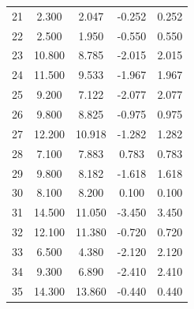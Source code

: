 \begin{table}[H]
\begin{tabular}{|c|c|c|c|c|}
		21 & 2.300 & 2.047 & -0.252 & 0.252 \\
		22 & 2.500 & 1.950 & -0.550 & 0.550 \\
		23 & 10.800 & 8.785 & -2.015 & 2.015 \\
		24 & 11.500 & 9.533 & -1.967 & 1.967 \\
		25 & 9.200 & 7.122 & -2.077 & 2.077 \\
		26 & 9.800 & 8.825 & -0.975 & 0.975 \\
		27 & 12.200 & 10.918 & -1.282 & 1.282 \\
		28 & 7.100 & 7.883 & 0.783 & 0.783 \\
		29 & 9.800 & 8.182 & -1.618 & 1.618 \\
		30 & 8.100 & 8.200 & 0.100 & 0.100 \\
		31 & 14.500 & 11.050 & -3.450 & 3.450 \\
		32 & 12.100 & 11.380 & -0.720 & 0.720 \\
		33 & 6.500 & 4.380 & -2.120 & 2.120 \\
		34 & 9.300 & 6.890 & -2.410 & 2.410 \\
		35 & 14.300 & 13.860 & -0.440 & 0.440 \\
		\hline
	\end{tabular}
	\label{tab:depth_results}
\end{table}


